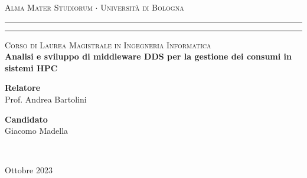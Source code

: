 
\begin{titlepage}
	\begin{center}
		{{\Large{\textsc{Alma Mater Studiorum $\cdot$ Universit\`a di
		Bologna}}}} \rule[0.1cm]{15.8cm}{0.1mm}
		\rule[0.5cm]{15.8cm}{0.6mm}
			\large{\textsc{Corso di Laurea Magistrale in Ingegneria Informatica}}
			\\[1.8cm]
			\LARGE
			{\bfseries Analisi e sviluppo di middleware DDS per la gestione dei consumi in sistemi HPC}\\[1.2cm]
	\end{center}
	\vspace{4.5cm}
	\vfill
	\begin{minipage}{0.35\textwidth}
		{\bfseries Relatore}\\
		Prof. Andrea Bartolini 
	\end{minipage}
	\hfill
	\begin{minipage}{0.35\textwidth}
		\begin{flushright} {\bfseries Candidato}\\
		Giacomo Madella \end{flushright} 
	\end{minipage} \\
\begin{center}
	Ottobre 2023
\end{center}
	
\end{titlepage}




